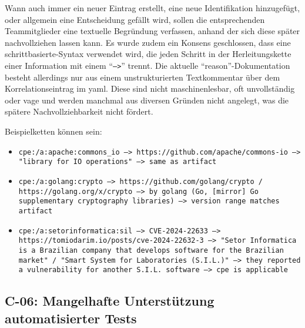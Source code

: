 Wann auch immer ein neuer Eintrag erstellt, eine neue Identifikation hinzugefügt, oder allgemein eine Entscheidung gefällt wird, sollen die entsprechenden Teammitglieder eine textuelle Begründung verfassen, anhand der sich diese später nachvollziehen lassen kann.
Es wurde zudem ein Konsens geschlossen, dass eine schrittbasierte-Syntax verwendet wird, die jeden Schritt in der Herleitungskette einer Information mit einem \enquote{\texttt{-->}} trennt.
Die aktuelle \enquote{reason}-Dokumentation besteht allerdings nur aus einem unstrukturierten Textkommentar über dem Korrelationseintrag im \acrshort{yaml}.
Diese sind nicht maschinenlesbar, oft unvollständig oder vage und werden manchmal aus diversen Gründen nicht angelegt, was die spätere Nachvollziehbarkeit nicht fördert.

Beispielketten können sein:

\begin{itemize}
    \itemsep0em
    \item \texttt{cpe:/a:apache:commons\_io --> https://github.com/apache/commons-io --> "library for IO operations" --> same as artifact}
    \item \texttt{cpe:/a:golang:crypto --> https://github.com/golang/crypto / https://golang.org/x/crypto --> by golang (Go, [mirror] Go supplementary cryptography libraries) --> version range matches artifact}
    \item \texttt{cpe:/a:setorinformatica:sil --> CVE-2024-22633 --> https://tomiodarim.io/posts/cve-2024-22632-3 --> "Setor Informatica is a Brazilian company that develops software for the Brazilian market" / "Smart System for Laboratories (S.I.L.)" --> they reported a vulnerability for another S.I.L. software --> cpe is applicable}
\end{itemize}

\subsection{C-06: Mangelhafte Unterstützung automatisierter Tests}\label{subsec:c-06-falle-ohne-aktion-konnen-nicht-dokumentiert-werden}


